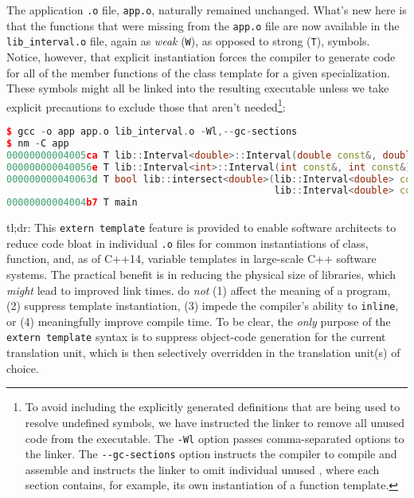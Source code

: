 \noindent The application \lstinline!.o! file, \lstinline!app.o!, naturally remained
unchanged. What's new here is that the functions that were missing from
the \lstinline!app.o! file are now available in the
\lstinline!lib_interval.o! file, again as \emph{weak} (\lstinline!W!), as
opposed to strong (\lstinline!T!), symbols. Notice, however, that explicit
instantiation forces the compiler to generate code for all of the member
functions of the class template for a given specialization. These
symbols might all be linked into the resulting executable unless we take
explicit precautions to exclude those that aren't
needed{\cprotect\footnote{To avoid including the explicitly generated
definitions that are being used to resolve undefined symbols, we have
instructed the linker to remove all unused code  from the
executable. The \lstinline!-Wl! option passes comma-separated options to
the linker. The \lstinline!--gc-sections! option instructs the compiler
to compile and assemble and instructs the linker to omit individual
unused , where each section contains, for example, its own
  instantiation of a function template.}}:

\begin{lstlisting}[language=C++]
$ gcc -o app app.o lib_interval.o -Wl,--gc-sections
$ nm -C app
00000000004005ca T lib::Interval<double>::Interval(double const&, double const&)
000000000040056e T lib::Interval<int>::Interval(int const&, int const&)
000000000040063d T bool lib::intersect<double>(lib::Interval<double> const&,
                                               lib::Interval<double> const&)
00000000004004b7 T main
\end{lstlisting}
    
\noindent tl;dr: This \lstinline!extern!~\lstinline!template! feature is provided to
enable software architects to reduce code bloat in individual
\lstinline!.o! files for common instantiations of class,
function, and, as of C++14, variable templates in
large-scale C++ software systems. The practical benefit is in reducing
the physical size of libraries, which \emph{might} lead to improved link
times.  do \emph{not}
(1) affect the meaning of a program, (2) suppress template
instantiation, (3) impede the compiler's ability to \lstinline!inline!, or
(4) meaningfully improve compile time. To be clear, the \emph{only}
purpose of the \lstinline!extern!~\lstinline!template! syntax is to suppress
object-code generation for the current translation unit, which is then
selectively overridden in the translation unit(s) of choice.

